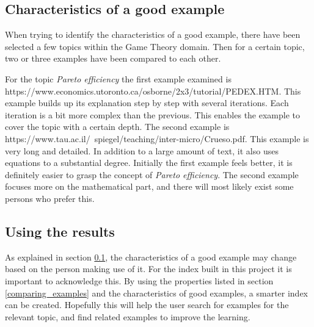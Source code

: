 

\subsection{Characteristics of a good example} \label{good_example}

When trying to identify the characteristics of a good example, there have been selected a few topics within the Game Theory domain. Then for a certain topic, two or three examples have been compared to each other.  

For the topic \textit{Pareto efficiency} the first example examined is\\ https://www.economics.utoronto.ca/osborne/2x3/tutorial/PEDEX.HTM. This example builds up its explanation step by step with several iterations. Each iteration is a bit more complex than the previous. This enables the example to cover the topic with a certain depth. The second example is https://www.tau.ac.il/~spiegel/teaching/inter-micro/Crueso.pdf. This example is very long and detailed. In addition to a large amount of text, it also uses equations to a substantial degree. Initially the first example feels better, it is definitely easier to grasp the concept of \textit{Pareto efficiency}. The second example focuses more on the mathematical part, and there will most likely exist some persons who prefer this. 

\subsection{Using the results}

As explained in section \ref{good_example}, the characteristics of a good example may change based on the person making use of it. For the index built in this project it is important to acknowledge this. By using the properties listed in section \ref{comparing_examples} and the characteristics of good examples, a smarter index can be created. Hopefully this will help the user search for examples for the relevant topic, and find related examples to improve the learning.

\cleardoublepage